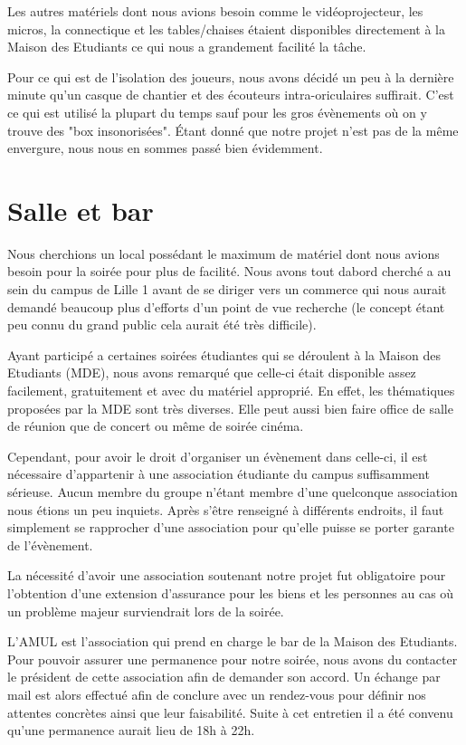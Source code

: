 Les autres matériels dont nous avions besoin comme le vidéoprojecteur,
les micros, la connectique et les tables/chaises étaient disponibles directement à
la Maison des Etudiants ce qui nous a grandement facilité la tâche.

Pour ce qui est de l'isolation des joueurs, nous avons décidé un peu à
la dernière minute qu'un casque de chantier et des écouteurs
intra-oriculaires suffirait. C'est ce qui est utilisé la plupart du
temps sauf pour les gros évènements où on y trouve des "box
insonorisées". Étant donné que notre projet n'est pas de la même
envergure, nous nous en sommes passé bien évidemment.

\section{Salle et bar}%
\label{sec:salle_et_bar}

Nous cherchions un local possédant le maximum de matériel dont nous
avions besoin pour la soirée pour plus de facilité. Nous avons tout
dabord cherché a au sein du campus de Lille 1 avant de se diriger vers
un commerce qui nous aurait demandé beaucoup plus d'efforts d'un point de
vue recherche (le concept étant peu connu du grand public cela aurait été
très difficile).

Ayant participé a certaines soirées étudiantes qui se déroulent à la
Maison des Etudiants (MDE), nous avons remarqué que celle-ci était
disponible assez facilement, gratuitement et avec du matériel approprié.
En effet, les thématiques proposées par la MDE sont très diverses. Elle
peut aussi bien faire office de salle de réunion que de concert ou même
de soirée cinéma.

Cependant, pour avoir le droit d'organiser un évènement dans celle-ci, il est nécessaire
d'appartenir à une association étudiante du campus suffisamment sérieuse. Aucun
membre du groupe n'étant membre d'une quelconque association nous étions un
peu inquiets. Après s'être renseigné à différents endroits, il faut
simplement se rapprocher d'une association pour qu'elle puisse se porter
garante de l'évènement.

La nécessité d'avoir une association soutenant notre projet fut obligatoire pour
l'obtention d'une extension d'assurance pour les biens et les personnes
au cas où un problème majeur surviendrait lors de la soirée.

L'AMUL est l'association qui prend en charge le bar de la Maison des
Etudiants. Pour pouvoir assurer une permanence pour notre soirée, nous
avons du contacter le président de cette association afin de demander
son accord. Un échange par mail est alors effectué afin de conclure avec
un rendez-vous pour définir nos attentes concrètes ainsi que leur faisabilité.
Suite à cet entretien il a été convenu qu'une permanence
aurait lieu de 18h à 22h.


